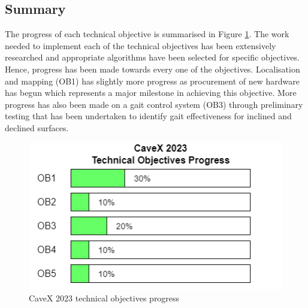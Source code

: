 \subsection{Summary}
The progress of each technical objective is summarised in Figure \ref{fig:progress-bars}. The work needed to implement each of the technical objectives has been extensively researched and appropriate algorithms have been selected for specific objectives. Hence, progress has been made towards every one of the objectives. Localisation and mapping (OB1) has slightly more progress as procurement of new hardware has begun which represents a major milestone in achieving this objective. More progress has also been made on a gait control system (OB3) through preliminary testing that has been undertaken to identify gait effectiveness for inclined and declined surfaces.

\begin{figure}[H]
    \centering
    \includegraphics[scale=0.8]{images/progress_bars.png}
    \caption{CaveX 2023 technical objectives progress}
    \label{fig:progress-bars}
\end{figure}